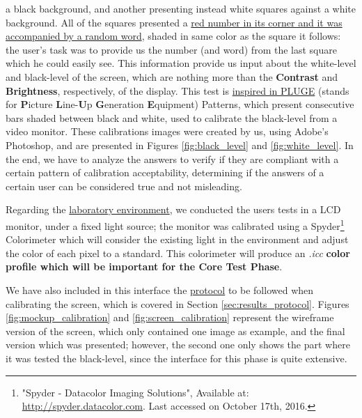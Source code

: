 a black background, and another presenting instead white squares against a white background. All of the squares presented a \ul{red number in its
corner and it was accompanied by a random word}, shaded in same color as the square it follows: the user's task was to provide us the number (and
word) from the last square which he could easily see. This information provide us input about the white-level and black-level of the screen, which
are nothing more than the \textbf{Contrast} and \textbf{Brightness}, respectively, of the display. This test is \ul{inspired in PLUGE} (stands for \textbf{P}icture
\textbf{L}ine-\textbf{U}p \textbf{G}eneration \textbf{E}quipment) Patterns, which present consecutive bars shaded between black and white, used to calibrate the black-level from a video
monitor. These calibrations images were created by us, using Adobe's Photoshop, and are presented in Figures \ref{fig:black_level} and
\ref{fig:white_level}. In the end, we have to analyze the answers to verify if they are compliant with a certain pattern of calibration acceptability,
determining if the answers of a certain user can be considered true and not misleading. \par
%
Regarding the \ul{laboratory environment}, we conducted the users tests in a LCD monitor, under a fixed light source; the monitor was calibrated
using a Spyder\footnote{"Spyder - Datacolor Imaging Solutions", Available at: \url{http://spyder.datacolor.com}. Last accessed on October 17th, 2016.}
Colorimeter which will consider the existing light in the environment and adjust the color of each pixel to a standard. This colorimeter will produce an
\emph{.icc} \textbf{color profile which will be important for the Core Test Phase}. \par
%
We have also included in this interface the \ul{protocol} to be followed when calibrating the screen, which is covered in Section \ref{sec:results_protocol}.
Figures \ref{fig:mockup_calibration} and \ref{fig:screen_calibration} represent the wireframe version of the screen, which only contained one image as
example, and the final version which was presented; however, the second one only shows the part where it was tested the black-level, since the interface
for this phase is quite extensive. \par
%
